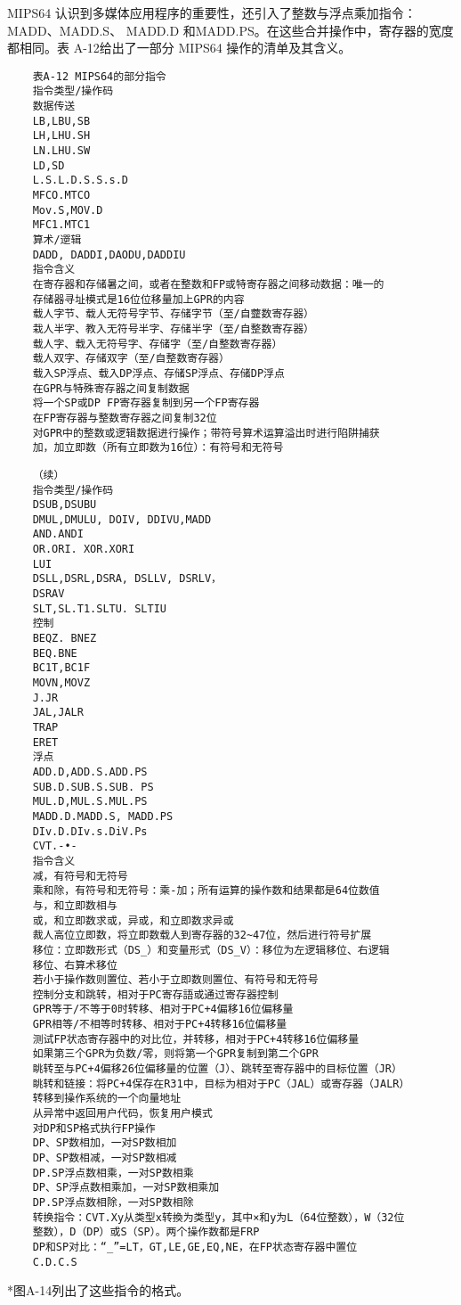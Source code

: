 MIPS64 认识到多媒体应用程序的重要性，还引入了整数与浮点乘加指令：MADD、MADD.S、
MADD.D 和MADD.PS。在这些合并操作中，寄存器的宽度都相同。表 A-12给出了一部分 MIPS64
操作的清单及其含义。

\begin{verbatim}
    表A-12 MIPS64的部分指令
    指令类型/操作码
    数据传送
    LB,LBU,SB
    LH,LHU.SH
    LN.LHU.SW
    LD,SD
    L.S.L.D.S.S.s.D
    MFCO.MTCO
    Mov.S,MOV.D
    MFC1.MTC1
    算术/遻辑
    DADD, DADDI,DAODU,DADDIU
    指令含义
    在寄存器和存储暑之间，或者在整数和FP或特寄存器之间移动数据：唯一的
    存储器寻址模式是16位位移量加上GPR的内容
    载人字节、载人无符号字节、存储字节（至/自虀数寄存器）
    栽人半字、教入无符号半字、存储半字（至/自整数寄存器）
    载人字、载入无符号字、存储字（至/自整数寄存器）
    载人双字、存储双字（至/自整数寄存器）
    载入SP浮点、载入DP浮点、存储SP浮点、存储DP浮点
    在GPR与特殊寄存器之间复制数据
    将一个SP或DP FP寄存器复制到另一个FP寄存器
    在FP寄存器与整数寄存器之间复制32位
    对GPR中的整数或逻辑数据进行操作；带符号算术运算溢出时进行陷阱捕获
    加，加立即数（所有立即数为16位）：有符号和无符号
\end{verbatim}
\begin{verbatim}
    （续）
    指令类型/操作码
    DSUB,DSUBU
    DMUL,DMULU, DOIV, DDIVU,MADD
    AND.ANDI
    OR.ORI. XOR.XORI
    LUI
    DSLL,DSRL,DSRA, DSLLV, DSRLV，
    DSRAV
    SLT,SL.T1.SLTU. SLTIU
    控制
    BEQZ. BNEZ
    BEQ.BNE
    BC1T,BC1F
    MOVN,MOVZ
    J.JR
    JAL,JALR
    TRAP
    ERET
    浮点
    ADD.D,ADD.S.ADD.PS
    SUB.D.SUB.S.SUB. PS
    MUL.D,MUL.S.MUL.PS
    MADD.D.MADD.S, MADD.PS
    DIv.D.DIv.s.DiV.Ps
    CVT.-•-
    指令含义
    减，有符号和无符号
    乘和除，有符号和无符号：乘-加；所有运算的操作数和结果都是64位数值
    与，和立即数相与
    或，和立即数求或，异或，和立即数求异或
    裁人高位立即数，将立即数载人到寄存器的32~47位，然后进行符号扩展
    移位：立即数形式（DS_）和变量形式（DS_V）：移位为左逻辑移位、右逻辑
    移位、右算术移位
    若小于操作数则置位、若小于立即数则置位、有符号和无符号
    控制分支和跳转，相对于PC寄存語或通过寄存器控制
    GPR等于/不等于0时转移、相对于PC+4偏移16位偏移量
    GPR相等/不相等时转移、相对于PC+4转移16位偏移量
    测试FP状态寄存器中的对比位，并转移，相对于PC+4转移16位偏移量
    如果第三个GPR为负数/零，则将第一个GPR复制到第二个GPR
    眺转至与PC+4偏移26位偏移量的位置（J）、跳转至寄存器中的目标位置（JR）
    眺转和链接：将PC+4保存在R31中，目标为相对于PC（JAL）或寄存器（JALR）
    转移到操作系统的一个向量地址
    从异常中返回用户代码，恢复用户模式
    对DP和SP格式执行FP操作
    DP、SP数相加，一对SP数相加
    DP、SP数相减，一对SP数相减
    DP.SP浮点数相乘，一对SP数相乘
    DP、SP浮点数相乘加，一对SP数相乘加
    DP.SP浮点数相除，一对SP数相除
    转换指令：CVT.Xy从类型x转換为类型y，其中×和y为L（64位整数），W（32位
    整数），D（DP）或S（SP）。两个操作数都是FRP
    DP和SP对比：“_”=LT，GT,LE,GE,EQ,NE，在FP状态寄存器中置位
    C.D.C.S
\end{verbatim}
*图A-14列出了这些指令的格式。
